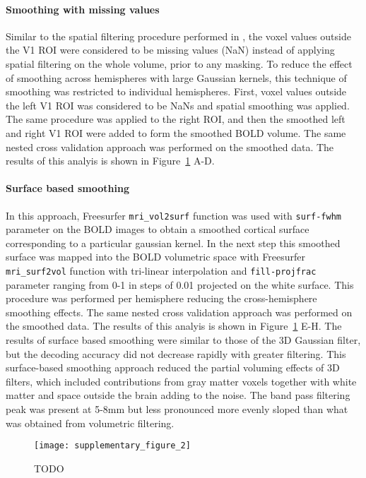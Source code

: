 \paragraph*{Smoothing with missing values}
Similar to the spatial filtering procedure performed in \citet{alink_2013}, 
the voxel values outside the V1 ROI were considered to be missing values (NaN)
instead of applying spatial filtering on the whole volume, prior to any masking.
To reduce the effect of smoothing across hemispheres with large Gaussian kernels,
this technique of smoothing was restricted to individual hemispheres. First, 
voxel values outside the left V1 ROI was considered to be NaNs and
spatial smoothing was applied. The same procedure was applied to the right ROI, 
and then the smoothed left and right V1 ROI were added to form the smoothed 
BOLD volume. The same nested cross validation approach was performed on the 
smoothed data. The results of this analyis is shown in Figure~\ref{fig:surface_ecs} A-D.  

\paragraph*{Surface based smoothing}
In this approach, Freesurfer \texttt{mri\_vol2surf} function \citep{dale_1999} 
was used with \texttt{surf-fwhm} parameter on the BOLD images to 
obtain a smoothed cortical surface corresponding to a particular 
gaussian kernel. In the next step this smoothed surface was mapped into 
the BOLD volumetric space with Freesurfer \texttt{mri\_surf2vol} function 
with tri-linear interpolation and \texttt{fill-projfrac} parameter 
ranging from 0-1 in steps of 0.01 projected on the white surface. This 
procedure was performed per hemisphere reducing the cross-hemisphere smoothing effects. 
The same nested cross validation approach was performed on the 
smoothed data. The results of this analyis is shown in Figure~\ref{fig:surface_ecs} E-H.
The results of surface based smoothing were similar to those of the 3D Gaussian filter, 
but the decoding accuracy did not decrease rapidly with greater filtering. 
This surface-based smoothing approach reduced the partial voluming effects of 3D filters, 
which included contributions from gray matter voxels together with 
white matter and space outside the brain adding to the noise. 
The band pass filtering peak was present at 5-8mm but less pronounced 
more evenly sloped than what was obtained from volumetric filtering.


\begin{figure} \centering
  \texttt{[image: supplementary\_figure\_2]}
  \caption{
	TODO
  }

    \label{fig:surface_ecs}
\end{figure}


